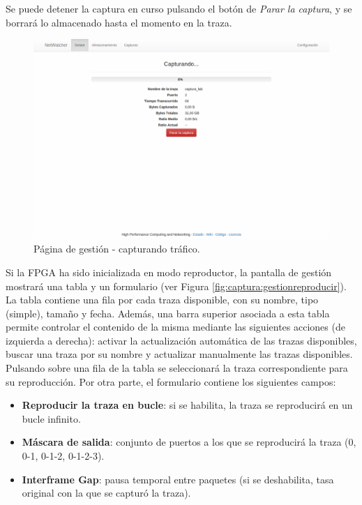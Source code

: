 Se puede detener la captura en curso pulsando el botón de \textit{Parar la captura}, y se borrará lo almacenado hasta el momento en la \gls{traza}.

\begin{figure}[!htp]
  \centering
  \includegraphics[width=\textwidth,clip=true]{graphics/capturas/gestor_capturando}
  \caption{Página de gestión - capturando tráfico.}
  \label{fig:captura:gestioncapturando}
\end{figure}

Si la \gls{FPGA} ha sido inicializada en modo reproductor, la pantalla de gestión mostrará una tabla y un formulario (ver Figura \ref{fig:captura:gestionreproducir}). La tabla contiene una fila por cada \gls{traza} disponible, con su nombre, tipo (\gls{simple}), tamaño y fecha. Además, una barra superior asociada a esta tabla permite controlar el contenido de la misma mediante las siguientes acciones (de izquierda a derecha): activar la actualización automática de las \glspl{traza} disponibles, buscar una \gls{traza} por su nombre y actualizar manualmente las \glspl{traza} disponibles. Pulsando sobre una fila de la tabla se seleccionará la \gls{traza} correspondiente para su reproducción. Por otra parte, el formulario contiene los siguientes campos:
\begin{itemize}
  \item \textbf{Reproducir la \gls{traza} en bucle}: si se habilita, la \gls{traza} se reproducirá en un bucle infinito.
  \item \textbf{Máscara de salida}: conjunto de puertos a los que se reproducirá la \gls{traza} (0, 0-1, 0-1-2, 0-1-2-3).
  \item \textbf{Interframe Gap}: pausa temporal entre paquetes (si se deshabilita, tasa original con la que se capturó la \gls{traza}).
\end{itemize}

